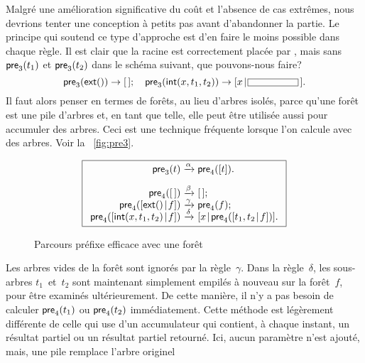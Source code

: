 Malgré une amélioration significative du coût et l'absence de cas
extrêmes, nous devrions tenter une conception à petits
pas avant d'abandonner la partie. Le
principe qui soutend ce type d'approche est d'en faire le moins
possible dans chaque règle. Il est clair que la racine est
correctement placée par
, mais sans
\(\textsf{pre}_3(t_1)\) et
\(\textsf{pre}_3(t_2)\) dans le schéma suivant, que pouvons-nous faire?
\begin{equation*}
\fun{pre}_3(\fun{ext}()) \rightarrow \el;
\quad
\fun{pre}_3(\fun{int}(x,t_1,t_2)) \rightarrow
  \cons{x}{\fbcode{CCCCCCC}\,}.
\end{equation*}
Il faut alors penser en termes de forêts, au lieu
d'arbres isolés, parce qu'une forêt est une pile d'arbres et, en tant
que telle, elle peut être utilisée aussi pour accumuler des
arbres. Ceci est une
technique fréquente lorsque l'on calcule avec des arbres. Voir
la \fig~\vref{fig:pre3}.
\begin{figure}
\begin{equation*}
\boxed{
\begin{array}{r@{\;}c@{\;}l}
\fun{pre}_3(t) & \xrightarrow{\smash{\alpha}} & \fun{pre}_4([t]).\\
\\
\fun{pre}_4(\el) & \xrightarrow{\smash{\beta}} & \el;\\
\fun{pre}_4(\cons{\fun{ext}()}{f})
  & \xrightarrow{\smash{\gamma}} & \fun{pre}_4(f);\\
\fun{pre}_4(\cons{\fun{int}(x,t_1,t_2)}{f})
  & \xrightarrow{\smash{\delta}} &
  \cons{x}{\fun{pre}_4(\cons{t_1,t_2}{f})}.
\end{array}}
\end{equation*}
\caption{Parcours préfixe efficace avec une forêt}
\label{fig:pre3}
\end{figure}
Les arbres vides de la forêt sont ignorés par la
règle~\(\gamma\). Dans la règle~\(\delta\), les sous-arbres
\(t_1\)~et~\(t_2\) sont maintenant simplement empilés à nouveau sur la
forêt~\(f\), pour être examinés ultérieurement. De cette manière, il
n'y a pas besoin de calculer
\(\textsf{pre}_4(t_1)\) ou
\(\textsf{pre}_4(t_2)\) immédiatement. Cette méthode est légèrement
différente de celle qui use d'un accumulateur qui contient, à chaque
instant, un résultat partiel ou un résultat partiel retourné. Ici,
aucun paramètre n'est ajouté, mais, une pile remplace l'arbre originel
